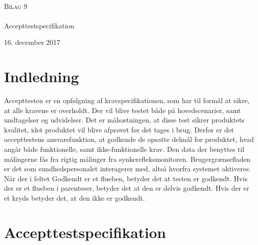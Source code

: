 

\begin{titlingpage}
\begin{center}

~ \\[3cm]


\textsc{\LARGE Bilag 9}\\[1.5cm]


\noindent\makebox[\linewidth]{\rule{\textwidth}{0.4pt}}\\
[0.5cm]{\Huge Accepttestspecifikation}
\noindent\makebox[\linewidth]{\rule{\textwidth}{0.4pt}}
\end{center}
\vfill
\begin{center}
{\large 16. december 2017}
\end{center}
\end{titlingpage}

\newpage
\tableofcontents*


\chapter{Indledning}
Accepttesten er en opfølgning af kravspecifikationen, som har til formål at sikre, at alle kravene er overholdt. Der vil blive testet både på hovedscenarier, samt undtagelser og udvidelser. Det er målsætningen, at disse test sikrer produktets kvalitet, idet produktet vil blive afprøvet før det tages i brug. Derfor er det accepttestens ansvarsfunktion, at godkende de opsatte delmål for produktet, hvad angår både funktionelle, samt ikke-funktionelle krav.
Den data der benyttes til målingerne fås fra rigtig målinger fra synkerefleksmonitoren. Brugergrænsefladen er det som sundhedspersonalet interagerer med, altså hvorfra systemet
aktiveres. Når der i feltet Godkendt er et flueben, betyder det at testen er godkendt. Hvis der er et flueben i parenteser, betyder det at den er delvis godkendt. Hvis der er et kryds betyder
det, at den ikke er godkendt.










\chapter{Accepttestspecifikation}

